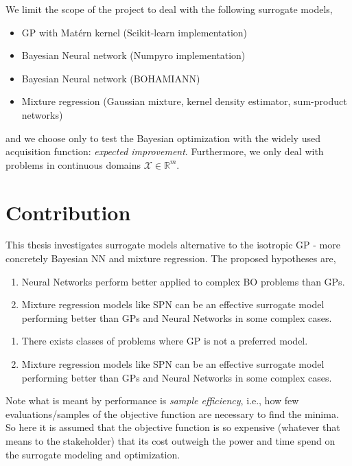 We limit the scope of the project to deal with the following surrogate models, 
\begin{itemize}[noitemsep]
    \item GP with Matérn kernel (Scikit-learn implementation)
    \item Bayesian Neural network (Numpyro implementation)
    \item Bayesian Neural network (BOHAMIANN)
    \item Mixture regression (Gaussian mixture, kernel density estimator, sum-product networks)
\end{itemize}
and we choose only to test the Bayesian optimization with the widely used acquisition function:
\textit{expected improvement}. Furthermore, we only deal with problems in continuous domains
$\mathcal{X} \in \mathbb{R}^m$.

\section{Contribution}
This thesis investigates surrogate models alternative to the isotropic GP - more concretely Bayesian NN
and mixture regression. The proposed hypotheses are,
\begin{enumerate}[noitemsep]
    \item Neural Networks perform better applied to complex BO problems than GPs.
    \item Mixture regression models like SPN can be an effective surrogate model
    performing better than GPs and Neural Networks in some complex cases. 
\end{enumerate}

\begin{enumerate}[noitemsep]
    \item There exists classes of problems where GP is not a preferred model. 
    \item Mixture regression models like SPN can be an effective surrogate model
    performing better than GPs and Neural Networks in some complex cases. 
\end{enumerate}


Note what is meant by performance is \textit{sample efficiency}, i.e., how few evaluations/samples
of the objective function are necessary to find the minima. So here it is assumed that the objective
function is so expensive (whatever that means to the stakeholder) that its cost outweigh the power
and time spend on the surrogate modeling and optimization.


